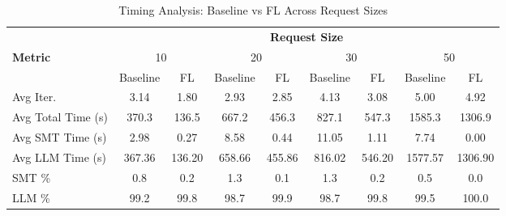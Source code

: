 \begin{table*}[t]
\centering
\caption{Timing Analysis: Baseline vs FL Across Request Sizes}
\label{tab:timing_transposed}
\footnotesize
\setlength{\tabcolsep}{5pt}
\begin{tabular}{lcccccccc}
\toprule
& \multicolumn{8}{c}{\textbf{Request Size}} \\
\cmidrule(lr){2-9}
\textbf{Metric} & \multicolumn{2}{c}{10} & \multicolumn{2}{c}{20} & \multicolumn{2}{c}{30} & \multicolumn{2}{c}{50} \\
\cmidrule(lr){2-9}
  & Baseline & FL & Baseline & FL & Baseline & FL & Baseline & FL \\
\midrule
Avg Iter. & 3.14 & 1.80 & 2.93 & 2.85 & 4.13 & 3.08 & 5.00 & 4.92 \\
Avg Total Time (s) & 370.3 & 136.5 & 667.2 & 456.3 & 827.1 & 547.3 & 1585.3 & 1306.9 \\
Avg SMT Time (s) & 2.98 & 0.27 & 8.58 & 0.44 & 11.05 & 1.11 & 7.74 & 0.00 \\
Avg LLM Time (s) & 367.36 & 136.20 & 658.66 & 455.86 & 816.02 & 546.20 & 1577.57 & 1306.90 \\
SMT \% & 0.8 & 0.2 & 1.3 & 0.1 & 1.3 & 0.2 & 0.5 & 0.0 \\
LLM \% & 99.2 & 99.8 & 98.7 & 99.9 & 98.7 & 99.8 & 99.5 & 100.0 \\
\bottomrule
\end{tabular}
\end{table*}
